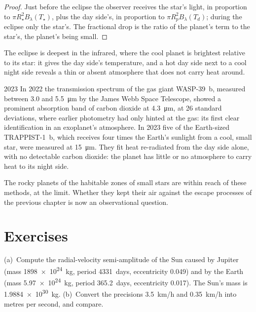 \begin{proof}
Just before the eclipse the observer receives the star's light, in
proportion to $\pi R_\star^2 B_\lambda(T_\star)$, plus the day side's,
in proportion to $\pi R_p^2 B_\lambda(T_d)$; during the eclipse only the
star's. The fractional drop is the ratio of the planet's term to the
star's, the planet's being small.
\end{proof}

The eclipse is deepest in the infrared, where the cool planet is
brightest relative to its star: it gives the day side's temperature, and
a hot day side next to a cool night side reveals a thin or absent
atmosphere that does not carry heat around.

\begin{dated}{2023}
In 2022 the transmission spectrum of the gas giant WASP-39~b, measured
between 3.0 and \qty{5.5}{\micro m} by the James Webb Space Telescope,
showed a prominent absorption band of carbon dioxide at
\qty{4.3}{\micro m}, at 26 standard deviations, where earlier photometry
had only hinted at the gas: its first clear identification in an
exoplanet's atmosphere. In 2023 five  of the
Earth-sized TRAPPIST-1~b, which receives four times the Earth's sunlight
from a cool, small star, were measured at \qty{15}{\micro m}. They fit
heat re-radiated from the day side alone, with no detectable carbon
dioxide: the planet has little or no atmosphere to carry heat to its
night side.
\end{dated}

The rocky planets of the habitable zones of small stars are within reach
of these methods, at the limit. Whether they kept their air against the
escape processes of the previous chapter is now an observational
question.

\section{Exercises}

\begin{exercise}[$\star$]\label{exo:b3:exoplanets:1}
(a)~Compute the radial-velocity semi-amplitude of the Sun caused by
Jupiter (mass \qty{1898e24}{kg}, period \num{4331}~days, eccentricity
0.049) and by the Earth (mass \qty{5.97e24}{kg}, period \num{365.2}~days,
eccentricity 0.017). The Sun's mass is \qty{1.9884e30}{kg}.
(b)~Convert the precisions \qty{3.5}{km/h} and \qty{0.35}{km/h} into
metres per second, and compare.
\end{exercise}

